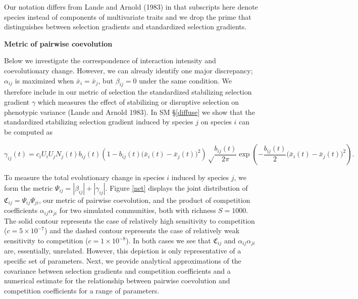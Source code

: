 \documentclass[]{article}
\begin{document}
Our notation differs from Lande and Arnold (1983) in that subscripts
here denote species instead of components of multivariate traits and we
drop the prime that distinguishes between selection gradients and
standardized selection gradients.

\textbf{Metric of pairwise coevolution}

Below we investigate the correspondence of interaction intensity and
coevolutionary change. However, we can already identify one major
discrepancy; \(\alpha_{ij}\) is maximized when \(\bar x_i=\bar x_j\),
but \(\beta_{ij}=0\) under the same condition. We therefore include in
our metric of selection the standardized stabilizing selection gradient
\(\gamma\) which measures the effect of stabilizing or disruptive
selection on phenotypic variance (Lande and Arnold 1983). In SM
\S\ref{diffuse} we show that the standardized stabilizing selection
gradient induced by species \(j\) on species \(i\) can be computed as

\begin{equation}
\gamma_{ij}(t)=c_iU_iU_jN_j(t)b_{ij}(t)\left(1-b_{ij}(t)\big(\bar x_i(t)-\bar x_j(t)\big)^2\right) \sqrt\frac{b_{ij}(t)}{2\pi}\exp\left(-\frac{b_{ij}(t)}{2}\big(\bar x_i(t)-\bar x_j(t)\big)^2\right).
\end{equation}

To measure the total evolutionary change in species \(i\) induced by
species \(j\), we form the metric
\(\Psi_{ij}=|\beta_{ij}|+|\gamma_{ij}|\). Figure \ref{net} displays the
joint distribution of \(\mathfrak{C}_{ij}=\Psi_{ij}\Psi_{ji}\), our
metric of pairwise coevolution, and the product of competition
coefficients \(\alpha_{ij}\alpha_{ji}\) for two simulated communities,
both with richness \(S=1000\). The solid contour represents the case of
relatively high sensitivity to competition (\(c=5\times10^{-7}\)) and
the dashed contour represents the case of relatively weak sensitivity to
competition (\(c=1\times10^{-8}\)). In both cases we see that
\(\mathfrak{C}_{ij}\) and \(\alpha_{ij}\alpha_{ji}\) are, essentially,
unrelated. However, this depiction is only representative of a specific
set of parameters. Next, we provide analytical approximations of the
covariance between selection gradients and competition coefficients and
a numerical estimate for the relationship between pairwise coevolution
and competition coefficients for a range of parameters.
\end{document}
